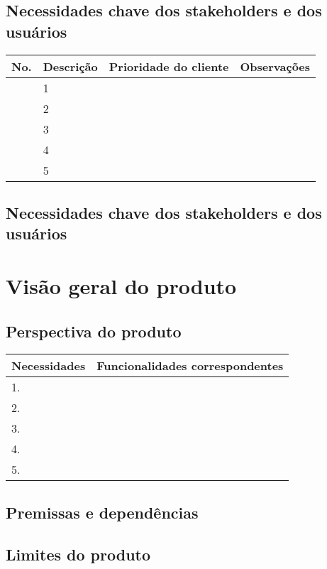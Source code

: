 \documentclass[12pt, a4paper]{article}
\begin{document}
        \subsection{Necessidades chave dos stakeholders e dos usuários}
            \begin{tabular}{ p{3.75cm} | p{3.75cm} | p{3.75cm} | p{3.75cm} }
                \hline
                \textbf{No.} &
                \textbf{Descrição} &
                \textbf{Prioridade do cliente} &
                \textbf{Observações} \\ \hline
                & 1 & & \\ \hline
                & 2 & & \\ \hline
                & 3 & & \\ \hline
                & 4 & & \\ \hline
                & 5 & & \\ \hline
            \end{tabular}
        \subsection{Necessidades chave dos stakeholders e dos usuários}

    \section{Visão geral do produto}
        \subsection{Perspectiva do produto}
            \begin{tabular}{ p{7.5cm} | p{7.5cm} }
                \hline
                \textbf{Necessidades} &
                \textbf{Funcionalidades correspondentes} \\ \hline
                1. & \\ \hline
                2. & \\ \hline
                3. & \\ \hline
                4. & \\ \hline
                5. & \\ \hline
            \end{tabular}
        \subsection{Premissas e dependências}
        \subsection{Limites do produto}
\end{document}
